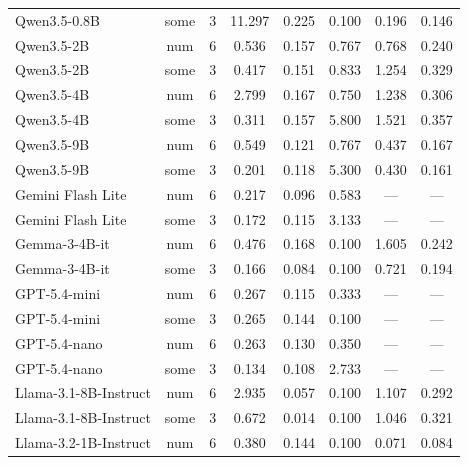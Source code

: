 \documentclass[11pt]{article}
\begin{document}
{\begin{table}[t]
\begin{tabular}{@{}p{2.6cm}ccccccc@{}}
  Qwen3.5-0.8B & some & 3 & 11.297 & 0.225 & 0.100 & 0.196 & 0.146 \\

  Qwen3.5-2B & num & 6 & 0.536 & 0.157 & 0.767 & 0.768 & 0.240 \\

  Qwen3.5-2B & some & 3 & 0.417 & 0.151 & 0.833 & 1.254 & 0.329 \\

  Qwen3.5-4B & num & 6 & 2.799 & 0.167 & 0.750 & 1.238 & 0.306 \\

  Qwen3.5-4B & some & 3 & 0.311 & 0.157 & 5.800 & 1.521 & 0.357 \\

  Qwen3.5-9B & num & 6 & 0.549 & 0.121 & 0.767 & 0.437 & 0.167 \\

  Qwen3.5-9B & some & 3 & 0.201 & 0.118 & 5.300 & 0.430 & 0.161 \\

  Gemini Flash Lite & num & 6 & 0.217 & 0.096 & 0.583 & --- & --- \\

  Gemini Flash Lite & some & 3 & 0.172 & 0.115 & 3.133 & --- & --- \\

  Gemma-3-4B-it & num & 6 & 0.476 & 0.168 & 0.100 & 1.605 & 0.242 \\

  Gemma-3-4B-it & some & 3 & 0.166 & 0.084 & 0.100 & 0.721 & 0.194 \\

  GPT-5.4-mini & num & 6 & 0.267 & 0.115 & 0.333 & --- & --- \\

  GPT-5.4-mini & some & 3 & 0.265 & 0.144 & 0.100 & --- & --- \\

  GPT-5.4-nano & num & 6 & 0.263 & 0.130 & 0.350 & --- & --- \\

  GPT-5.4-nano & some & 3 & 0.134 & 0.108 & 2.733 & --- & --- \\

  Llama-3.1-8B-Instruct & num & 6 & 2.935 & 0.057 & 0.100 & 1.107 & 0.292 \\

  Llama-3.1-8B-Instruct & some & 3 & 0.672 & 0.014 & 0.100 & 1.046 & 0.321 \\

  Llama-3.2-1B-Instruct & num & 6 & 0.380 & 0.144 & 0.100 & 0.071 & 0.084 \\


\end{tabular}
\end{table}}
\end{document}
